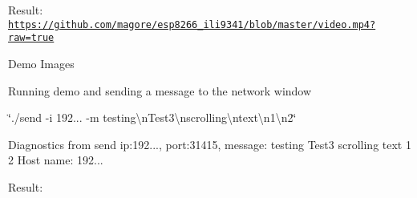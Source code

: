 \begin{DoxyItemize}
\item Result\+: \href{https://github.com/magore/esp8266_ili9341/blob/master/video.mp4?raw=true}{\tt https\+://github.\+com/magore/esp8266\+\_\+ili9341/blob/master/video.\+mp4?raw=true}
\end{DoxyItemize}

\begin{DoxyParagraph}{Demo Images}

\begin{DoxyItemize}
\item Running demo and sending a message to the network window
\item \char`\"{}./send -\/i 192... -\/m \textquotesingle{}testing\textbackslash{}n\+Test3\textbackslash{}nscrolling\textbackslash{}ntext\textbackslash{}n1\textbackslash{}n2\textquotesingle{}\char`\"{}
\begin{DoxyItemize}
\item Diagnostics from send ip\+:192..., port\+:31415, message\+: testing Test3 scrolling text 1 2 Host name\+: 192...
\item Result\+:  
\end{DoxyItemize}
\end{DoxyItemize}
\end{DoxyParagraph}
